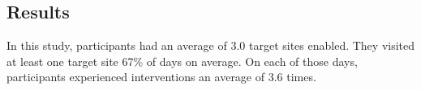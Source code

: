 \subsection{Results}

In this study, participants had an average of 3.0 target sites enabled. They visited at least one target site 67\% of days on average. On each of those days, participants experienced interventions an average of 3.6 times. 








